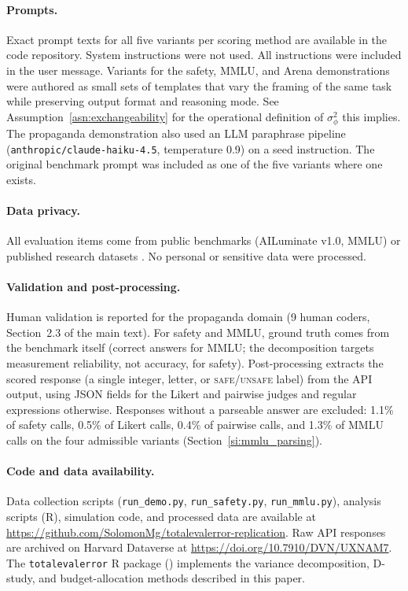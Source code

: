 \paragraph{Prompts.} Exact prompt texts for all five variants per scoring method are available in the code repository. System instructions were not used. All instructions were included in the user message. Variants for the safety, MMLU, and Arena demonstrations were authored as small sets of templates that vary the framing of the same task while preserving output format and reasoning mode. See Assumption~\ref{asn:exchangeability} for the operational definition of $\sigma^2_\phi$ this implies. The propaganda demonstration also used an LLM paraphrase pipeline (\texttt{anthropic/claude-haiku-4.5}, temperature 0.9) on a seed instruction. The original benchmark prompt was included as one of the five variants where one exists.

\paragraph{Data privacy.} All evaluation items come from public benchmarks (AILuminate v1.0, MMLU) or published research datasets \citep{waight_state_forthcoming}. No personal or sensitive data were processed.

\paragraph{Validation and post-processing.} Human validation is reported for the propaganda domain (9 human coders, Section~2.3 of the main text). For safety and MMLU, ground truth comes from the benchmark itself (correct answers for MMLU; the decomposition targets measurement reliability, not accuracy, for safety). Post-processing extracts the scored response (a single integer, letter, or \textsc{safe}/\textsc{unsafe} label) from the API output, using JSON fields for the Likert and pairwise judges and regular expressions otherwise. Responses without a parseable answer are excluded: 1.1\% of safety calls, 0.5\% of Likert calls, 0.4\% of pairwise calls, and 1.3\% of MMLU calls on the four admissible variants (Section~\ref{si:mmlu_parsing}).

\paragraph{Code and data availability.} Data collection scripts (\texttt{run\_demo.py}, \texttt{run\_safety.py}, \texttt{run\_mmlu.py}), analysis scripts (R), simulation code, and processed data are available at \url{https://github.com/SolomonMg/totalevalerror-replication}. Raw API responses are archived on Harvard Dataverse at \url{https://doi.org/10.7910/DVN/UXNAM7}. The \texttt{totalevalerror} R package (\codeurl) implements the variance decomposition, D-study, and budget-allocation methods described in this paper.



